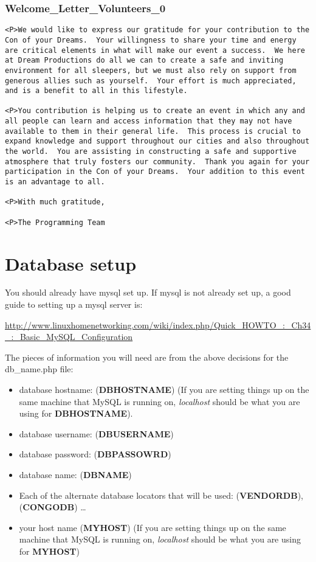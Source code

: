 \documentclass[captions=tablesignature]{scrartcl}
\begin{document}
\subsubsection{Welcome\_Letter\_Volunteers\_0}
\label{sec-3-7-8}
\begin{verbatim}
<P>We would like to express our gratitude for your contribution to the
Con of your Dreams.  Your willingness to share your time and energy
are critical elements in what will make our event a success.  We here
at Dream Productions do all we can to create a safe and inviting
environment for all sleepers, but we must also rely on support from
generous allies such as yourself.  Your effort is much appreciated,
and is a benefit to all in this lifestyle.

<P>You contribution is helping us to create an event in which any and
all people can learn and access information that they may not have
available to them in their general life.  This process is crucial to
expand knowledge and support throughout our cities and also throughout
the world.  You are assisting in constructing a safe and supportive
atmosphere that truly fosters our community.  Thank you again for your
participation in the Con of your Dreams.  Your addition to this event
is an advantage to all.

<P>With much gratitude,

<P>The Programming Team
\end{verbatim}

\section{Database setup}
\label{sec-4}

You should already have mysql set up.  If mysql is not already set
up, a good guide to setting up a mysql server is:

\begin{small}
\url{http://www.linuxhomenetworking.com/wiki/index.php/Quick_HOWTO_:_Ch34_:_Basic_MySQL_Configuration}
\end{small}

The pieces of information you will need are from the above decisions
for the db\_name.php file:

\begin{itemize}
\item database hostname: (\textbf{DBHOSTNAME}) (If you are setting things up on
the same machine that MySQL is running on, \emph{localhost} should be
what you are using for \textbf{DBHOSTNAME}).
\item database username: (\textbf{DBUSERNAME})
\item database password: (\textbf{DBPASSOWRD})
\item database name: (\textbf{DBNAME})
\item Each of the alternate database locators that will be used:
(\textbf{VENDORDB}), (\textbf{CONGODB}) \ldots{}
\item your host name (\textbf{MYHOST}) (If you are setting things up on the
same machine that MySQL is running on, \emph{localhost} should be what
you are using for \textbf{MYHOST})
\end{itemize}
\end{document}
